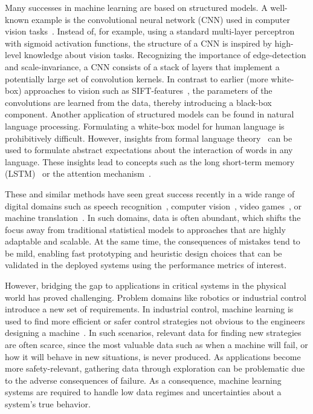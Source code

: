 Many successes in machine learning are based on structured models.
A well-known example is the convolutional neural network (CNN) used in computer vision tasks~\parencite{lecun_backpropagation_1989}.
Instead of, for example, using a standard multi-layer perceptron with sigmoid activation functions, the structure of a CNN is inspired by high-level knowledge about vision tasks.
Recognizing the importance of edge-detection and scale-invariance, a CNN consists of a stack of layers that implement a potentially large set of convolution kernels.
In contrast to earlier (more white-box) approaches to vision such as SIFT-features~\parencite{lowe_object_1999}, the parameters of the convolutions are learned from the data, thereby introducing a black-box component.
Another application of structured models can be found in natural language processing.
Formulating a white-box model for human language is prohibitively difficult.
However, insights from formal language theory~\parencite{chomsky_aspects_2014} can be used to formulate abstract expectations about the interaction of words in any language.
These insights lead to concepts such as the long short-term memory (LSTM)~\parencite{hochreiter_long_1997} or the attention mechanism~\parencite{bahdanau_neural_2014,chorowski_attention-based_2015}.

These and similar methods have seen great success recently in a wide range of digital domains such as speech recognition~\parencite{chorowski_attention-based_2015}, computer vision~\parencite{russakovsky_imagenet_2015}, video games~\parencite{berner_dota_2019}, or machine translation~\parencite{johnson_googles_2017}.
In such domains, data is often abundant, which shifts the focus away from traditional statistical models to approaches that are highly adaptable and scalable.
At the same time, the consequences of mistakes tend to be mild, enabling fast prototyping and heuristic design choices that can be validated in the deployed systems using the performance metrics of interest.

However, bridging the gap to applications in critical systems in the physical world has proved challenging.
Problem domains like robotics or industrial control introduce a new set of requirements.
In industrial control, machine learning is used to find more efficient or safer control strategies not obvious to the engineers designing a machine~\parencite{hein_benchmark_2017}.
In such scenarios, relevant data for finding new strategies are often scarce, since the most valuable data such as when a machine will fail, or how it will behave in new situations, is never produced.
As applications become more safety-relevant, gathering data through exploration can be problematic due to the adverse consequences of failure.
As a consequence, machine learning systems are required to handle low data regimes and uncertainties about a system's true behavior.


